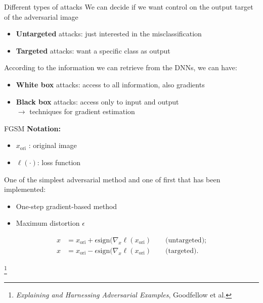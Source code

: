 \documentclass{beamer}
\theoremstyle{plain}
\theoremstyle{definition}
\newcommand\blfootnote[1]{%
  \begingroup
  \renewcommand\thefootnote{}\footnote{#1}%
  \addtocounter{footnote}{-1}%
  \endgroup
}
\begin{document}
\begin{frame}{Different types of attacks}
We can decide if we want control on the output target of the adversarial image
    \begin{itemize}
        \item \textbf{Untargeted} attacks: just interested in the misclassification 
        \item \textbf{Targeted} attacks: want a specific  class as output 
    \end{itemize} 
\medskip
According to the information we can retrieve from the DNNs, we can have: 
\begin{itemize}
    \item \textbf{White box} attacks: access to all information, also gradients 
    \item \textbf{Black box} attacks: access only to input and output \\$\to$ techniques for gradient estimation 
\end{itemize}
\end{frame}

\begin{frame}{FGSM}
\textbf{Notation: }
\begin{itemize}
    \item  $x_\text{ori}$ : original image
    \item $\ell(\cdot)$: loss function
\end{itemize}

\bigskip
One of the simplest adversarial method and one of first that has been implemented: 
\begin{itemize}
    \item One-step gradient-based method
    \item Maximum distortion $\epsilon$
\end{itemize}
\begin{align*}
    x &= x_\text{ori} + \epsilon \text{sign}(\nabla_x \ell(x_\text{ori}) \qquad \text{(untargeted);} \\
    x &= x_\text{ori} - \epsilon \text{sign}(\nabla_x \ell(x_\text{ori}) \qquad \text{(targeted).}
\end{align*}

\blfootnote{\textit{Explaining and Harnessing Adversarial Examples}, Goodfellow et al. }
    
\end{frame}
\end{document}
